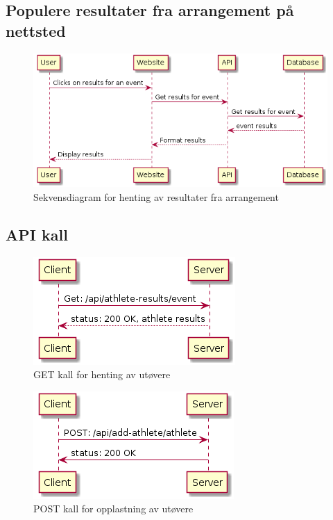 \documentclass[norsk]{article}
\begin{document}
\subsection{Populere resultater fra arrangement på nettsted}
\begin{figure}[ht]
\centering 
    \includegraphics[scale=0.5]{images/get-athletes}
    \caption{Sekvensdiagram for henting av resultater fra arrangement}\label{fig:get-at-res}
\end{figure}

\subsection{API kall}
\begin{figure}[ht]
\centering 
    \includegraphics[scale=0.7]{images/get-athletes-api-call.png}
    \caption{GET kall for henting av utøvere}\label{fig:get-at-api}
\end{figure}

\begin{figure}[ht]
\centering 
    \includegraphics[scale=0.7]{images/post-athletes-api-call.png}
    \caption{POST kall for opplastning av utøvere}\label{fig:post-at-api}
\end{figure}
\end{document}
